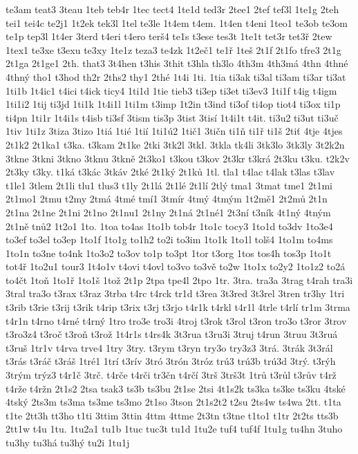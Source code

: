 {te3am
teat3
3teau
1teb
teb4r
1tec
tect4
1te1d
ted3r
2tee1
2tef
tef3l
1te1g
2teh
tei1
tei4c
te2j1
1t2ek
tek3l
1tel
te3le
1t4em
t4em.
1t4en
t4eni
1teo1
te3ob
te3om
te1p
tep3l
1t4er
3terd
t4eri
t4ero
terš4
te1s
t3ese
tes3t
1te1t
tet3r
tet3ř
2tew
1tex1
te3xe
t3exu
te3xy
1te1z
teza3
te4zk
1t2eč1
te1ř
1teš
2t1f
2t1fo
tfre3
2t1g
2t1ga
2t1ge1
2th.
that3
3t4hen
t3his
3thit
t3hla
th3lo
4th3m
4th3má
4thn
4thné
4thný
tho1
t3hod
th2r
2ths2
thy1
2thé
1t4i
1ti.
1tia
ti3ak
ti3al
ti3am
ti3ar
ti3at
1ti1b
1t4ic1
t4ici
t4ick
ticy4
1ti1d
1tie
tieb3
ti3ep
ti3et
ti3ev3
1ti1f
t4ig
t4igm
1ti1i2
1tij
ti3jd
1ti1k
1t4i1l
1ti1m
t3imp
1t2in
t3ind
ti3of
ti4op
tiot4
ti3ox
ti1p
ti4pn
1ti1r
1t4i1s
t4isb
ti3sf
3tism
tis3p
3tist
3tisí
1t4i1t
t4it.
ti3u2
ti3ut
ti3uč
1tiv
1ti1z
3tiza
3tizo
1tiá
1tié
1tií
1ti1ú2
1tič1
3tičn
ti1ň
ti1ř
ti1š
2tiť
4tje
4tjes
2t1k2
2t1ka1
t3ka.
t3kam
2t1ke
2tki
3tk2l
3tkl.
3tkla
tk4li
3tk3lo
3tk3ly
3t2k2n
3tkne
3tkni
3tkno
3tknu
3tkně
2t3ko1
t3kou
t3kov
2t3kr
t3krá
2t3ku
t3ku.
t2k2v
2t3ky
t3ky.
t1ká
t3kác
3tkáv
2tké
2t1ký
2t1ků
1tl.
tla1
t4lac
t4lak
t3las
t3lav
t1le1
3tlem
2t1li
tlu1
tlus3
t1ly
2t1lá
2t1lé
2t1lí
2tlý
tma1
3tmat
tme1
2t1mi
2t1mo1
2tmu
t2my
2tmá
4tmé
tmí1
3tmír
4tmý
4tmým
1t2mě1
2t2mů
2t1n
2t1na
2t1ne
2t1ni
2t1no
2t1nu1
2t1ny
2t1ná
2t1né1
2t3ní
t3ník
4t1ný
4tným
2t1ně
tnů2
1t2o1
1to.
1toa
to4as
1to1b
tob4r
1to1c
tocy3
1to1d
to3dv
1to3e4
to3ef
to3el
to3ep
1to1f
1to1g
to1h2
to2i
to3im
1to1k
1to1l
tolš4
1to1m
to4ms
1to1n
to3ne
to4nk
1to3o2
to3ov
to1p
to3pt
1tor
t3org
1tos
tos4h
tos3p
1to1t
tot4ř
1to2u1
tour3
1t4o1v
t4ovi
t4ovl
to3vo
to3vě
to2w
1to1x
to2y2
1to1z2
to2á
to4čt
1toň
1to1ř
1to1š
1tož
2t1p
2tpa
tpe4l
2tpo
1tr.
3tra.
tra3a
3trag
t4rah
tra3i
3tral
tra3o
t3rax
t3raz
3trba
t4rc
t4rck
tr1d
t3rea
3t3red
3t3rel
3tren
tr3hy
1tri
t3rib
t3rie
t3rij
t3rik
t4rip
t3rix
t3rj
t3rjo
t4r1k
t4rkl
t4r1l
4trle
t4rlí
tr1m
3trma
t4r1n
t4rno
t4rné
t4rný
1tro
tro3e
tro3i
4troj
t3rok
t3rol
t3ron
tro3o
t3ror
3trov
t3ro3z4
t3roč
t3roň
t3rož
1t4r1s
t4rs4k
3t3rua
t3ru3i
3truj
t4run
3truu
3t3ruá
t3ruš
1tr1v
t4rva
trve4
1try
3try.
t3rym
t3ryn
try3o
try3z3
3trá.
3trák
3t3rál
t3rás
t3ráč
t3ráš
1tré1
1trí
t3rív
3tró
3trón
3tróz
trú3
trú3b
trú3d
3trý.
t3rýh
3trým
trýz3
t4r1č
3trč.
t4rče
t4rči
tr3čn
t4rčí
3trš
3trš3t
1trů
t3růl
t3rův
t4rž
t4rže
t4ržn
2t1s2
2tsa
tsak3
ts3b
ts3bu
2t1se
2tsi
4t1s2k
ts3ka
ts3ke
ts3ku
4tské
4tský
2ts3m
ts3ma
ts3me
ts3mo
2t1so
3tson
2t1s2t2
t2su
2ts4w
ts4wa
2tt.
t1ta
t1te
2tt3h
tt3ho
t1ti
3ttim
3ttin
4ttm
4ttme
2t3tn
t3tne
t1to1
t1tr
2t2ts
tts3b
2tt1w
t4u
1tu.
1tu2a1
tu1b
1tuc
tuc3t
tu1d
1tu2e
tuf4
tuf4f
1tu1g
tu4hn
3tuho
tu3hy
tu3há
tu3hý
tu2i
1tu1j
}
